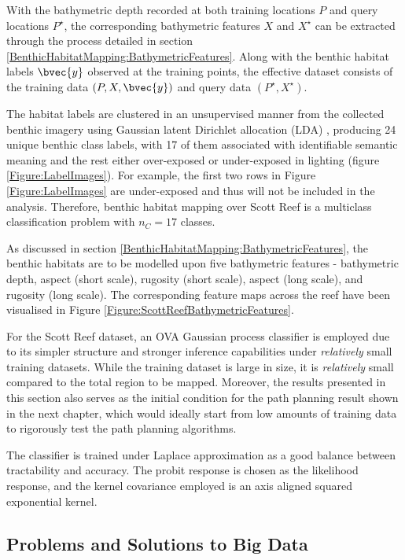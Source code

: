 		With the bathymetric depth recorded at both training locations $P$ and query locations $P^{\star}$, the corresponding bathymetric features $X$ and $X^{\star}$ can be extracted through the process detailed in section \ref{BenthicHabitatMapping:BathymetricFeatures}. Along with the benthic habitat labels $\bvec{y}$ observed at the training points, the effective dataset consists of the training data $(P, X, \bvec{y})$ and query data $(P^{\star}, X^{\star})$.

		The habitat labels are clustered in an unsupervised manner from the collected benthic imagery using Gaussian latent Dirichlet allocation (LDA) \citep{Steinberg2015128}, producing 24 unique benthic class labels, with 17 of them associated with identifiable semantic meaning and the rest either over-exposed or under-exposed in lighting (figure \ref{Figure:LabelImages}). For example, the first two rows in Figure \ref{Figure:LabelImages} are under-exposed and thus will not be included in the analysis. Therefore, benthic habitat mapping over Scott Reef is a multiclass classification problem with $n_{C} = 17$ classes.
		
		As discussed in section \ref{BenthicHabitatMapping:BathymetricFeatures}, the benthic habitats are to be modelled upon five bathymetric features - bathymetric depth, aspect (short scale), rugosity (short scale), aspect (long scale), and rugosity (long scale). The corresponding feature maps across the reef have been visualised in Figure \ref{Figure:ScottReefBathymetricFeatures}.
			
		For the Scott Reef dataset, an OVA Gaussian process classifier is employed due to its simpler structure and stronger inference capabilities under \textit{relatively} small training datasets. While the training dataset is large in size, it is \textit{relatively} small compared to the total region to be mapped. Moreover, the results presented in this section also serves as the initial condition for the path planning result shown in the next chapter, which would ideally start from low amounts of training data to rigorously test the path planning algorithms.
		
		The classifier is trained under Laplace approximation as a good balance between tractability and accuracy. The probit response is chosen as the likelihood response, and the kernel covariance employed is an axis aligned squared exponential kernel.
			
		\subsection{Problems and Solutions to Big Data}
		\label{BenthicHabitatMapping:ScottReef:BigData}
		
